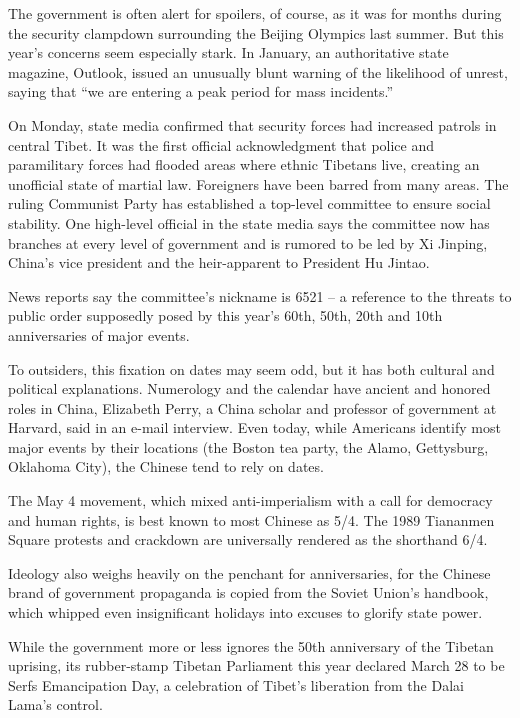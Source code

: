 \documentclass[12pt,a4paper,onecolumn]{article}
\begin{document}
\begin{CJK*}{GBK}{song}
The government is often alert for spoilers, of course, as it was for months during the security
clampdown surrounding the Beijing Olympics last summer. But this year's concerns seem especially
stark. In January, an authoritative state magazine, Outlook, issued an unusually blunt warning of
the likelihood of unrest, saying that ``we are entering a peak period for mass incidents.''

On Monday, state media confirmed that security forces had increased patrols in central Tibet. It was
the first official acknowledgment that police and paramilitary forces had flooded areas where ethnic
Tibetans live, creating an unofficial state of martial law. Foreigners have been barred from many
areas. The ruling Communist Party has established a top-level committee to ensure social stability.
One high-level official in the state media says the committee now has branches at every level of
government and is rumored to be led by Xi Jinping, China's vice president and the heir-apparent to
President Hu Jintao.

News reports say the committee's nickname is 6521 -- a reference to the threats to public order
supposedly posed by this year's 60th, 50th, 20th and 10th anniversaries of major events.

To outsiders, this fixation on dates may seem odd, but it has both cultural and political
explanations. Numerology and the calendar have ancient and honored roles in China, Elizabeth Perry,
a China scholar and professor of government at Harvard, said in an e-mail interview. Even today,
while Americans identify most major events by their locations (the Boston tea party, the Alamo,
Gettysburg, Oklahoma City), the Chinese tend to rely on dates.

The May 4 movement, which mixed anti-imperialism with a call for democracy and human rights, is best
known to most Chinese as 5/4. The 1989 Tiananmen Square protests and crackdown are universally
rendered as the shorthand 6/4.

Ideology also weighs heavily on the penchant for anniversaries, for the Chinese brand of government
propaganda is copied from the Soviet Union's handbook, which whipped even insignificant holidays
into excuses to glorify state power.

While the government more or less ignores the 50th anniversary of the Tibetan uprising, its
rubber-stamp Tibetan Parliament this year declared March 28 to be Serfs Emancipation Day, a
celebration of Tibet's liberation from the Dalai Lama's control.


\end{CJK*}
\end{document}
